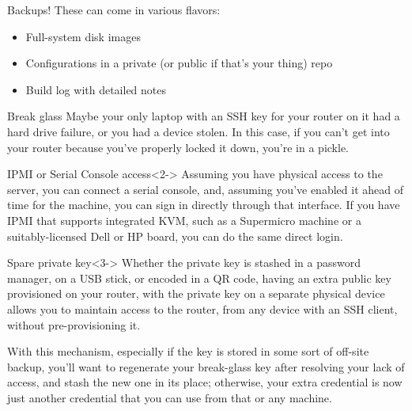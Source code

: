 \documentclass[bigger]{beamer}
\begin{document}
\begin{frame}[label={sec:orgbfa871a}]{Backups!}
  These can come in various flavors:
  \begin{itemize}
  \item<2-> Full-system disk images
  \item<3-> Configurations in a private (or public if that's your thing) repo
  \item<4-> Build log with detailed notes
  \end{itemize}
\end{frame}

\begin{frame}[label={sec:org48c7f73}]{Break glass}
Maybe your only laptop with an SSH key for your router on it had a hard
drive failure, or you had a device stolen. In this case, if you can't get
into your router because you've properly locked it down, you're in a
pickle.

\begin{block}{IPMI or Serial Console access}<2->
Assuming you have physical access to the server, you can connect a serial
console, and, assuming you've enabled it ahead of time for the machine, you
can sign in directly through that interface. If you have IPMI that supports
integrated KVM, such as a Supermicro machine or a suitably-licensed Dell or
HP board, you can do the same direct login.
\end{block}

\begin{block}{Spare private key}<3->
Whether the private key is stashed in a password manager, on a USB stick,
or encoded in a QR code, having an extra public key provisioned on your
router, with the private key on a separate physical device allows you to
maintain access to the router, from any device with an SSH client, without
pre-provisioning it.

With this mechanism, especially if the key is stored in some sort of
off-site backup, you'll want to regenerate your break-glass key after
resolving your lack of access, and stash the new one in its place;
otherwise, your extra credential is now just another credential that you
can use from that or any machine.
\end{block}
\end{frame}
\end{document}
